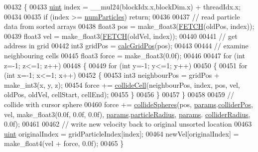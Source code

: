 \begin{DoxyCode}
00432 \{
00433     \hyperlink{particles__kernel_8cuh_a91ad9478d81a7aaf2593e8d9c3d06a14}{uint} index = \_\_mul24(blockIdx.x,blockDim.x) + threadIdx.x;
00434 
00435     \textcolor{keywordflow}{if} (index >= \hyperlink{particles_8cpp_a05b8a90212054a3eb1a036ae0c269596}{numParticles}) \textcolor{keywordflow}{return};
00436 
00437     \textcolor{comment}{// read particle data from sorted arrays}
00438     float3 pos = make\_float3(\hyperlink{particles__kernel_8cuh_a12269d678a65f18889c2a7e98c756457}{FETCH}(oldPos, index));
00439     float3 vel = make\_float3(\hyperlink{particles__kernel_8cuh_a12269d678a65f18889c2a7e98c756457}{FETCH}(oldVel, index));
00440 
00441     \textcolor{comment}{// get address in grid}
00442     int3 gridPos = \hyperlink{particles__kernel__impl_8cuh_a63d62750e6cbb8781c5ff252fc13c1fd}{calcGridPos}(pos);
00443 
00444     \textcolor{comment}{// examine neighbouring cells}
00445     float3 force = make\_float3(0.0f);
00446 
00447     \textcolor{keywordflow}{for} (\textcolor{keywordtype}{int} z=-1; z<=1; z++)
00448     \{
00449         \textcolor{keywordflow}{for} (\textcolor{keywordtype}{int} y=-1; y<=1; y++)
00450         \{
00451             \textcolor{keywordflow}{for} (\textcolor{keywordtype}{int} x=-1; x<=1; x++)
00452             \{
00453                 int3 neighbourPos = gridPos + make\_int3(x, y, z);
00454                 force += \hyperlink{particles__kernel__impl_8cuh_a8e623e11d4ac873cfbe9d7c916326363}{collideCell}(neighbourPos, index, pos, vel, oldPos, oldVel, cellStart, 
      cellEnd);
00455             \}
00456         \}
00457     \}
00458 
00459     \textcolor{comment}{// collide with cursor sphere}
00460     force += \hyperlink{particles__kernel__impl_8cuh_a1d93cb067b16b4a472e9c1a08d9d8e68}{collideSpheres}(pos, \hyperlink{particles__kernel__impl_8cuh_a8db8938e28edd17862daf58651051bdc}{params}.\hyperlink{struct_sim_params_aa27be265020f137f0a9cfbc3f1d2d9f8}{colliderPos}, vel, make\_float3(0.0f, 
      0.0f, 0.0f), \hyperlink{particles__kernel__impl_8cuh_a8db8938e28edd17862daf58651051bdc}{params}.\hyperlink{struct_sim_params_a7e131c24e1020c44173deb0f57a8c4af}{particleRadius}, \hyperlink{particles__kernel__impl_8cuh_a8db8938e28edd17862daf58651051bdc}{params}.
      \hyperlink{struct_sim_params_a06ca2162f6f0aec08343db6ed8cd4478}{colliderRadius}, 0.0f);
00461 
00462     \textcolor{comment}{// write new velocity back to original unsorted location}
00463     \hyperlink{particles__kernel_8cuh_a91ad9478d81a7aaf2593e8d9c3d06a14}{uint} originalIndex = gridParticleIndex[index];
00464     newVel[originalIndex] = make\_float4(vel + force, 0.0f);
00465 \}
\end{DoxyCode}
